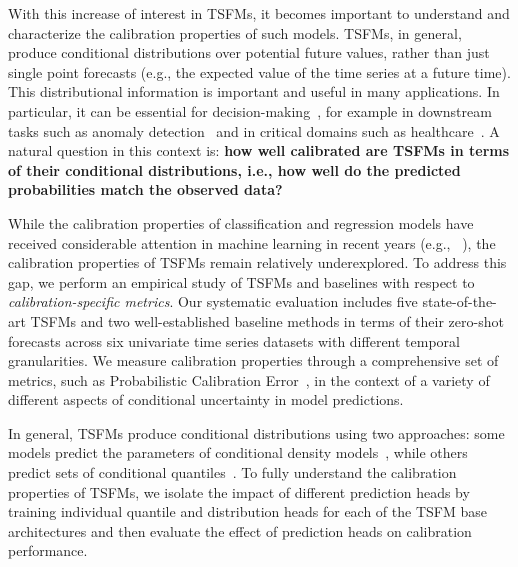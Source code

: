 \documentclass{article}
\begin{document}
With this increase of interest in TSFMs, it becomes important to understand and characterize the calibration properties of such models. 
TSFMs, in general, produce conditional distributions over potential future values, rather than just single point forecasts (e.g., the expected value of the time series at a future time). 
This  distributional information is important and useful in many applications. 
In particular, it can be essential for decision-making~\citep{probforcasttext,petropoulos2022forecasting}, for example in downstream tasks such as anomaly detection~\citep{confidenceanomaly} and in critical domains such as healthcare~\citep{farah2014bayesian,healthprobts}. 
A natural question in this context is: {\bf how well calibrated are TSFMs in terms of their conditional distributions, i.e., how well do the predicted probabilities match the observed data?} 


While the calibration properties of classification and regression models have received considerable attention in machine learning in recent years (e.g., ~\citet{guo2017calibration,regressioncalibration,beyondpinball}), the calibration properties of TSFMs remain relatively underexplored.
To address this gap, we perform an empirical study of TSFMs and baselines with respect to \textit{calibration-specific metrics}. 
Our systematic evaluation includes five state-of-the-art TSFMs and two well-established baseline methods in terms of their zero-shot forecasts across six univariate time series datasets with different temporal granularities.
We measure calibration properties through a comprehensive set of metrics, such as Probabilistic Calibration Error~\citep{calibrationNN,calibratedregression,beyondpinball},
in the context of a variety of different aspects of conditional uncertainty in model predictions.

In general, TSFMs produce conditional distributions using two approaches: some models predict the parameters of conditional density models~\citep{lagllama,moirai,chronos}, while others predict sets of conditional quantiles~\citep{timesfm,tirex,yinglong}.
To fully understand the calibration properties of TSFMs, we isolate the impact of different prediction heads by training individual quantile and distribution heads for each of the TSFM base architectures and then evaluate the effect of prediction heads on calibration performance.
\end{document}
